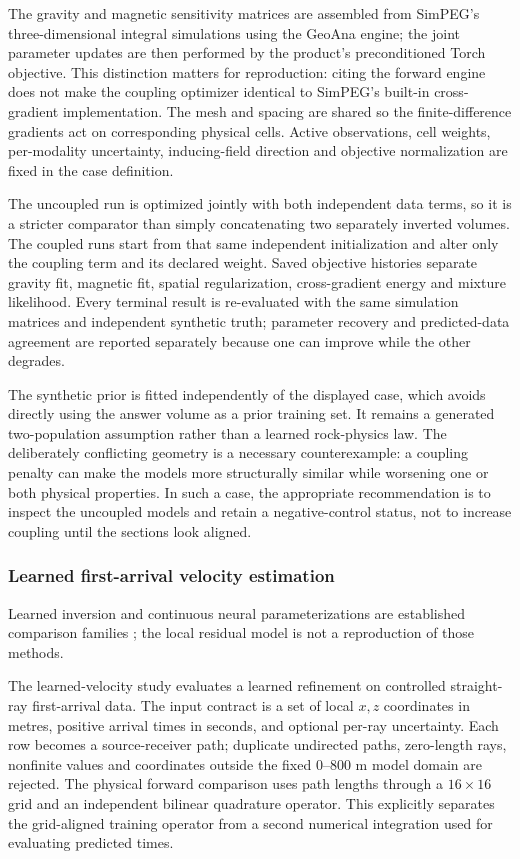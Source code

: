 The gravity and magnetic sensitivity matrices are assembled from
SimPEG's three-dimensional integral simulations using the GeoAna engine;
the joint parameter updates are then performed by the product's
preconditioned Torch objective. This distinction matters for
reproduction: citing the forward engine does not make the coupling
optimizer identical to SimPEG's built-in cross-gradient implementation.
The mesh and spacing are shared so the finite-difference gradients act
on corresponding physical cells. Active observations, cell weights,
per-modality uncertainty, inducing-field direction and objective
normalization are fixed in the case definition.

The uncoupled run is optimized jointly with both independent data terms,
so it is a stricter comparator than simply concatenating two separately
inverted volumes. The coupled runs start from that same independent
initialization and alter only the coupling term and its declared weight.
Saved objective histories separate gravity fit, magnetic fit, spatial
regularization, cross-gradient energy and mixture likelihood. Every
terminal result is re-evaluated with the same simulation matrices and
independent synthetic truth; parameter recovery and predicted-data
agreement are reported separately because one can improve while the
other degrades.

The synthetic prior is fitted independently of the displayed case,
which avoids directly using the answer volume as a prior training set.
It remains a generated two-population assumption rather than a learned
rock-physics law. The deliberately conflicting geometry is a necessary
counterexample: a coupling penalty can make the models more structurally
similar while worsening one or both physical properties. In such a
case, the appropriate recommendation is to inspect the uncoupled
models and retain a negative-control status, not to increase coupling
until the sections look aligned.

\subsubsection{Learned first-arrival velocity estimation}

Learned inversion and continuous neural parameterizations are established comparison families \cite{wulin2019,sun2023,openfwi}; the local residual model is not a reproduction of those methods.\label{method-velocity-learning}

The learned-velocity study evaluates a learned refinement on controlled straight-ray
first-arrival data. The input contract is a set of local \(x,z\)
coordinates in metres, positive arrival times in seconds, and optional
per-ray uncertainty. Each row becomes a source-receiver path; duplicate
undirected paths, zero-length rays, nonfinite values and coordinates
outside the fixed \(0\)--\(800\) m model domain are rejected. The
physical forward comparison uses path lengths through a \(16\times16\)
grid and an independent bilinear quadrature operator. This explicitly
separates the grid-aligned training operator from a second numerical
integration used for evaluating predicted times.

